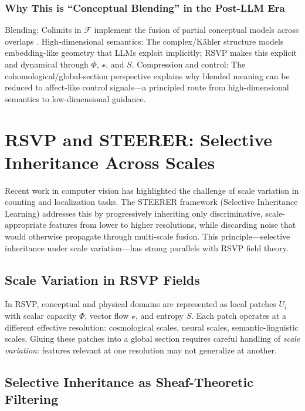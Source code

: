 \documentclass[12pt]{article}
\begin{document}
\subsubsection{Why This is “Conceptual Blending” in the Post-LLM Era}

Blending: Colimits in $\mathcal{F}$ implement the fusion of partial conceptual models across overlaps \citep{FauconnierTurner2002}. High-dimensional semantics: The complex/Kähler structure models embedding-like geometry that LLMs exploit implicitly; RSVP makes this explicit and dynamical through $\Phi$, $\mathcal{v}$, and $S$. Compression and control: The cohomological/global-section perspective explains why blended meaning can be reduced to affect-like control signals—a principled route from high-dimensional semantics to low-dimensional guidance.

\section{RSVP and STEERER: Selective Inheritance Across Scales}

Recent work in computer vision has highlighted the challenge of scale variation in counting and localization tasks. The STEERER framework (Selective Inheritance Learning) \citep{Han2023} addresses this by progressively inheriting only discriminative, scale-appropriate features from lower to higher resolutions, while discarding noise that would otherwise propagate through multi-scale fusion. This principle---selective inheritance under scale variation---has strong parallels with RSVP field theory.

\subsection{Scale Variation in RSVP Fields}

In RSVP, conceptual and physical domains are represented as local patches $U_i$ with scalar capacity $\Phi$, vector flow $\mathcal{v}$, and entropy $S$. Each patch operates at a different effective resolution: cosmological scales, neural scales, semantic-linguistic scales. Gluing these patches into a global section requires careful handling of \emph{scale variation}: features relevant at one resolution may not generalize at another.

\subsection{Selective Inheritance as Sheaf-Theoretic Filtering}
\end{document}

